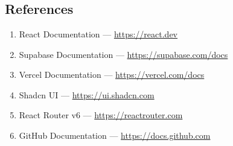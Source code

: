 \documentclass[12pt,a4paper]{report}     %
\begin{document}
\newpage
\chapter{}
\begin{normalsize}
\setlength{\baselineskip}{1.3\baselineskip}

\section{References}

\begin{enumerate}
    \item React Documentation — \url{https://react.dev}
    
    \item Supabase Documentation — \url{https://supabase.com/docs}
    
    \item Vercel Documentation — \url{https://vercel.com/docs}
    
    \item Shadcn UI — \url{https://ui.shadcn.com}
    
    \item React Router v6 — \url{https://reactrouter.com}
    
    \item GitHub Documentation — \url{https://docs.github.com}
    
\end{enumerate}

\end{normalsize}
\end{document}
